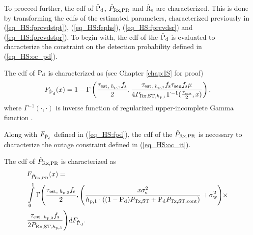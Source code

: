 To proceed further, the cdf of $\hat{\text{P}}_{\text{d}}$, $\hat{P}_{\text{Rx,PR}}$ and $\hat{\text{{R}}}_{\text{s}}$ are characterized. This is done by transforming the cdfs of the estimated parameters, characterized previously in (\ref{eq_HS:fprcvdstpt}), (\ref{eq_HS:fephs}), (\ref{eq_HS:fprcvdsr}) and (\ref{eq_HS:fprcvdstpr}). To begin with, the cdf of the $\hat{\text{P}}_{\text{d}}$ is evaluated to characterize the constraint on the detection probability defined in (\ref{eq_HS:oc_pd}). 
\begin{lemma} \label{lm_HS:lem1}
\normalfont
The cdf of $\text{P}_{\text{d}}$ is characterized as (see Chapter \ref{chap:IS} for proof) 
\begin{align}
F_{\hat{\text{P}}_{\text{d}}}(x) = 1 - \Gamma \left(\frac{\tau_{\text{est, $h_{\text{p,1}}$}} f_{\text{s}}}{2}, \frac{\tau_{\text{est, $h_{\text{p,1}}$}} f_{\text{s}} \tau_{\text{sen}} f_{\text{s}} \mu}{4 P_{\text{Rx,ST,$h_{\text{p,1}}$}} \Gamma^{-1}(\frac{\tau_{\text{sen}}}{2}, x) } \right), 
\label{eq_HS:fpd}
\end{align}
where $\Gamma^{-1}(\cdot, \cdot)$ is inverse function of regularized upper-incomplete Gamma function \cite{grad}.
\end{lemma}
Along with $F_{\hat{\text{P}}_{\text{d}}}$ defined in (\ref{eq_HS:fpd}), the cdf of the $\hat{P}_{\text{Rx,PR}}$ is necessary to characterize the outage constraint defined in (\ref{eq_HS:oc_it}). 
\begin{lemma} \label{lm_HS:lem2}
\normalfont
The cdf of $\hat{P}_{\text{Rx,PR}}$ is characterized as 
\begin{align}
&F_{\hat{P}_{\text{Rx,PR}}} (x) = \nonumber \\ 
&\int\limits_0^1 \Gamma \Bigg(\frac{\tau_{\text{est, $h_{\text{p,3}}$}} f_{\text{s}}}{2} , \Bigg( \frac{x \sigma^2_{\text{s}}}{h_{\text{p,1}} \cdot ((1 - \text{P}_{\text{d}}) P_{\text{Tx,ST}} + \text{P}_{\text{d}} P_{\text{Tx,ST,cont}})} + \sigma^2_{\text{w}}  \Bigg) \times \nonumber \\ 
&\frac{\tau_{\text{est, $h_{\text{p,3}}$}} f_{\text{s}}}{2 P_{\text{Rx,ST,$h_{\text{p,3}}$}}}  \Bigg) dF_{\hat{\text{P}}_{\text{d}}}. 
\label{eq_HS:fprcvdpr}
\end{align}
\end{lemma}

